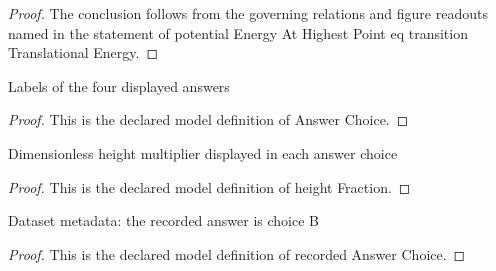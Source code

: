\begin{proof}
  The conclusion follows from the governing relations and figure readouts named in the statement of potential Energy At Highest Point eq transition Translational Energy.
\end{proof}
\begin{definition}
  \label{def:physics:phyx-mini-0787:phyxminiproblems-problemphyxmini0787-answerchoice}
  Labels of the four displayed answers
\end{definition}
\begin{proof}
  This is the declared model definition of Answer Choice.
\end{proof}
\begin{definition}
  \label{def:physics:phyx-mini-0787:phyxminiproblems-problemphyxmini0787-answerchoice-heightfraction}
  Dimensionless height multiplier displayed in each answer choice
\end{definition}
\begin{proof}
  This is the declared model definition of height Fraction.
\end{proof}
\begin{definition}
  \label{def:physics:phyx-mini-0787:phyxminiproblems-problemphyxmini0787-recordedanswerchoice}
  Dataset metadata: the recorded answer is choice B
\end{definition}
\begin{proof}
  This is the declared model definition of recorded Answer Choice.
\end{proof}
